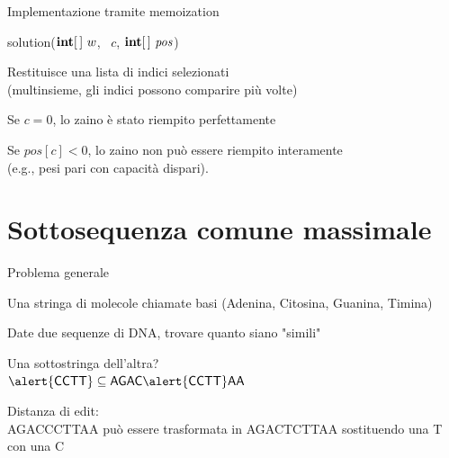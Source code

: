 \begin{frame}{Implementazione tramite memoization}

\vspace{-9pt}
\begin{Procedure}
\caption[A]{\textsf{solution}($\INTEGER[\,]\ w$, \INTEGER\ $c$, 
\alert{$\INTEGER[\,]\ \mathit{\mathit{pos}}$})}
\end{Procedure}

\BIL
\item Restituisce una \alert{lista} di indici selezionati\\ 
(\alert{multinsieme}, gli indici possono
comparire più volte)
\item Se $c=0$, lo zaino è stato riempito perfettamente
\item Se $pos[c] < 0$, lo zaino non può essere riempito interamente\\
(e.g., pesi pari con capacità dispari).
\EIL

\end{frame}



\section{Sottosequenza comune massimale}

\begin{frame}{Problema generale}

\vspace{-9pt}
\begin{myboxtitle}[DNA]
Una stringa di molecole chiamate basi (\alert{A}denina, \alert{C}itosina, \alert{G}uanina, \alert{T}imina)
\end{myboxtitle}


\begin{myboxtitle}[Problema]
Date due sequenze di DNA, trovare quanto siano "simili"
\end{myboxtitle}

\begin{myboxtitle}[Esempi]
\BIL
\item Una \alert{sottostringa} dell'altra?\\
$\alert{\textsf{CCTT}} \subseteq \textsf{AGAC\alert{CCTT}AA}$
\item \alert{Distanza di edit}:\\
\textsf{AGAC\alert{C}CTTAA} può essere trasformata in \textsf{AGAC\alert{T}CTTAA} sostituendo
una \textsf{T} con una \textsf{C}
\EIL
\end{myboxtitle}

\end{frame}



